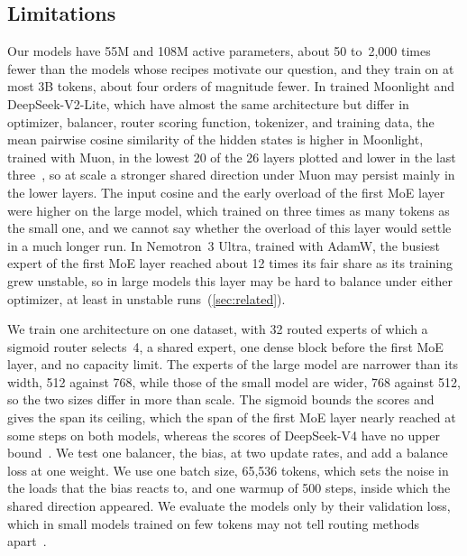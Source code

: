 \documentclass[11pt, a4paper]{article}
\begin{document}
\subsection{Limitations}
\label{sec:limitations}

Our models have 55M and 108M active parameters, about 50 to~2,000 times fewer than the models whose recipes motivate our question, and they train on at most 3B tokens, about four orders of magnitude fewer. In trained Moonlight and DeepSeek-V2-Lite, which have almost the same architecture but differ in optimizer, balancer, router scoring function, tokenizer, and training data, the mean pairwise cosine similarity of the hidden states is higher in Moonlight, trained with Muon, in the lowest 20 of the 26 layers plotted and lower in the last three~\citep[Fig.~15]{wang2026myth}, so at scale a stronger shared direction under Muon may persist mainly in the lower layers. The input cosine and the early overload of the first MoE layer were higher on the large model, which trained on three times as many tokens as the small one, and we cannot say whether the overload of this layer would settle in a much longer run. In Nemotron~3 Ultra, trained with AdamW, the busiest expert of the first MoE layer reached about 12 times its fair share as its training grew unstable, so in large models this layer may be hard to balance under either optimizer, at least in unstable runs~(\cref{sec:related}).

We train one architecture on one dataset, with 32 routed experts of which a sigmoid router selects~4, a shared expert, one dense block before the first MoE layer, and no capacity limit. The experts of the large model are narrower than its width, 512 against 768, while those of the small model are wider, 768 against 512, so the two sizes differ in more than scale. The sigmoid bounds the scores and gives the span its ceiling, which the span of the first MoE layer nearly reached at some steps on both models, whereas the scores of DeepSeek-V4 have no upper bound~\citep{deepseek2026v4}. We test one balancer, the bias, at two update rates, and add a balance loss at one weight. We use one batch size, 65,536 tokens, which sets the noise in the loads that the bias reacts to, and one warmup of 500 steps, inside which the shared direction appeared. We evaluate the models only by their validation loss, which in small models trained on few tokens may not tell routing methods apart~\citep{falke2026testbed}.
\end{document}
